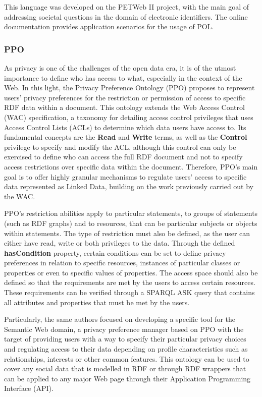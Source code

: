 This language was developed on the PETWeb II project, with the main goal of addressing societal questions in the domain of electronic identifiers.
The online documentation provides application scenarios for the usage of POL.

\subsubsection{PPO}
\label{sec:ppo}

As privacy is one of the challenges of the open data era, it is of the utmost importance to define who has access to what, especially in the context of the Web.
In this light, the Privacy Preference Ontology (PPO) \citep{sacco_privacy_2011} proposes to represent users' privacy preferences for the restriction or permission of access to specific RDF data within a document.
This ontology extends the Web Access Control (WAC) specification, a taxonomy for detailing access control privileges that uses Access Control Lists (ACLs) to determine which data users have access to.
Its fundamental concepts are the \textbf{Read} and \textbf{Write} terms, as well as the \textbf{Control} privilege to specify and modify the ACL, although this control can only be exercised to define who can access the full RDF document and not to specify access restrictions over specific data within the document.
Therefore, PPO's main goal is to offer highly granular mechanisms to regulate users' access to specific data represented as Linked Data, building on the work previously carried out by the WAC.

PPO's restriction abilities apply to particular statements, to groups of statements (such as RDF graphs) and to resources, that can be particular subjects or objects within statements.
The type of restriction must also be defined, as the user can either have read, write or both privileges to the data.
Through the defined \textbf{hasCondition} property, certain conditions can be set to define privacy preferences in relation to specific resources, instances of particular classes or properties or even to specific values of properties.
The access space should also be defined so that the requirements are met by the users to access certain resources.
These requirements can be verified through a SPARQL ASK query that contains all attributes and properties that must be met by the users.

Particularly, the same authors focused on developing a specific tool for the Semantic Web domain, a privacy preference manager \citep{sacco_privacy_2011b} based on PPO with the target of providing users with a way to specify their particular privacy choices and regulating access to their data depending on profile characteristics such as relationships, interests or other common features.
This ontology can be used to cover any social data that is modelled in RDF or through RDF wrappers that can be applied to any major Web page through their Application Programming Interface (API).

